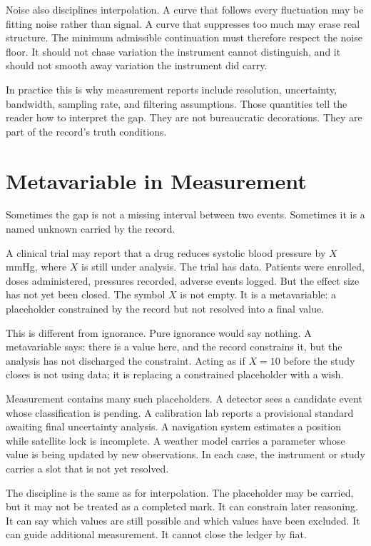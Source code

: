 Noise also disciplines interpolation. A curve that follows every fluctuation may
be fitting noise rather than signal. A curve that suppresses too much may erase
real structure. The minimum admissible continuation must therefore respect the
noise floor. It should not chase variation the instrument cannot distinguish,
and it should not smooth away variation the instrument did carry.

In practice this is why measurement reports include resolution, uncertainty,
bandwidth, sampling rate, and filtering assumptions. Those quantities tell the
reader how to interpret the gap. They are not bureaucratic decorations. They are
part of the record's truth conditions.

\section{Metavariable in Measurement}
\label{se:metavariable-in-measurement}

Sometimes the gap is not a missing interval between two events. Sometimes it is
a named unknown carried by the record.

A clinical trial may report that a drug reduces systolic blood pressure by
$X$ mmHg, where $X$ is still under analysis. The trial has data. Patients were
enrolled, doses administered, pressures recorded, adverse events logged. But the
effect size has not yet been closed. The symbol $X$ is not empty. It is a
metavariable: a placeholder constrained by the record but not resolved into a
final value.

This is different from ignorance. Pure ignorance would say nothing. A
metavariable says: there is a value here, and the record constrains it, but the
analysis has not discharged the constraint. Acting as if $X=10$ before the
study closes is not using data; it is replacing a constrained placeholder with a
wish.

Measurement contains many such placeholders. A detector sees a candidate event
whose classification is pending. A calibration lab reports a provisional
standard awaiting final uncertainty analysis. A navigation system estimates a
position while satellite lock is incomplete. A weather model carries a
parameter whose value is being updated by new observations. In each case, the
instrument or study carries a slot that is not yet resolved.

The discipline is the same as for interpolation. The placeholder may be carried,
but it may not be treated as a completed mark. It can constrain later reasoning.
It can say which values are still possible and which values have been excluded.
It can guide additional measurement. It cannot close the ledger by fiat.

